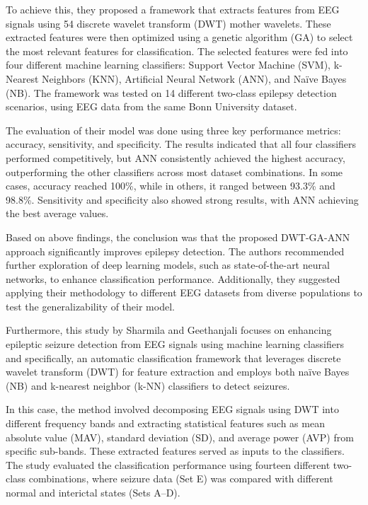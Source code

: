 \documentclass{article}
\begin{document}
To achieve this, they proposed a framework that extracts features from EEG signals using 54 discrete wavelet transform (DWT) mother wavelets. These extracted features were then optimized using a genetic algorithm (GA) to select the most relevant features for classification. The selected features were fed into four different machine learning classifiers: Support Vector Machine (SVM), k-Nearest Neighbors (KNN), Artificial Neural Network (ANN), and Naïve Bayes (NB). The framework was tested on 14 different two-class epilepsy detection scenarios, using EEG data from the same Bonn University dataset.

The evaluation of their model was done using three key performance metrics: accuracy, sensitivity, and specificity. The results indicated that all four classifiers performed competitively, but ANN consistently achieved the highest accuracy, outperforming the other classifiers across most dataset combinations. In some cases, accuracy reached 100\%, while in others, it ranged between 93.3\% and 98.8\%. Sensitivity and specificity also showed strong results, with ANN achieving the best average values.

Based on above findings, the conclusion was that the proposed DWT-GA-ANN approach significantly improves epilepsy detection. The authors recommended further exploration of deep learning models, such as state-of-the-art neural networks, to enhance classification performance. Additionally, they suggested applying their methodology to different EEG datasets from diverse populations to test the generalizability of their model.

Furthermore, this \cite{sharmila2016} study by Sharmila and Geethanjali focuses on enhancing epileptic seizure detection from EEG signals using machine learning classifiers and specifically, an automatic classification framework that leverages discrete wavelet transform (DWT) for feature extraction and employs both naïve Bayes (NB) and k-nearest neighbor (k-NN) classifiers to detect seizures.

In this case, the method involved decomposing EEG signals using DWT into different frequency bands and extracting statistical features such as mean absolute value (MAV), standard deviation (SD), and average power (AVP) from specific sub-bands. These extracted features served as inputs to the classifiers. The study evaluated the classification performance using fourteen different two-class combinations, where seizure data (Set E) was compared with different normal and interictal states (Sets A–D).
\end{document}
